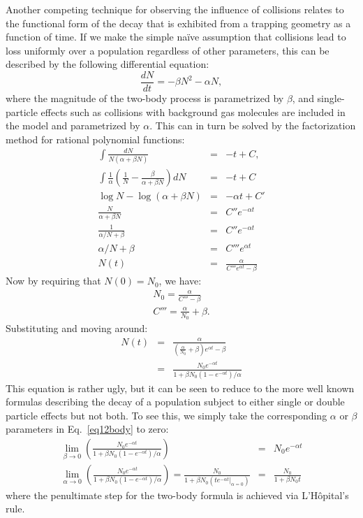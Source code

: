 Another competing technique for observing the influence of collisions relates to the functional form of the decay that is exhibited from a trapping geometry as a function of time.
If we make the simple na\"{i}ve assumption that collisions lead to loss uniformly over a population regardless of other parameters, this can be described by the following differential equation:
\begin{equation}
\frac{dN}{dt} = - \beta N^2  -\alpha N,
\end{equation}
where the magnitude of the two-body process is parametrized by $\beta$, and single-particle effects such as collisions with background gas molecules are included in the model and parametrized by $\alpha$.
This can in turn be solved by the factorization method for rational polynomial functions:
\begin{eqnarray}
\int\frac{dN}{N(\alpha+\beta N)} &=&- t + C,\\
\int\frac{1}{\alpha}\left(\frac{1}{N} - \frac{\beta}{\alpha +\beta N}  \right)dN &=& -t+C\\
\log{N} - \log{\left(\alpha + \beta N\right)} &=& -\alpha t + C'\\
\frac{N}{\alpha + \beta N} &=& C''e^{-\alpha t}\\
\frac{1}{\alpha/N + \beta} &=& C''e^{-\alpha t}\\
\alpha/N + \beta &=& C'''e^{\alpha t}\\
N(t) &=& \frac{\alpha}{C'''e^{\alpha t}-\beta}
\end{eqnarray}
Now by requiring that $N(0)=N_0$, we have:
\begin{eqnarray}
N_0 = \frac{\alpha}{C'''-\beta}\\
C''' = \frac{\alpha}{N_0}+\beta.
\end{eqnarray}
Substituting and moving around:
\begin{eqnarray}
N(t) &=& \frac{\alpha}{(\frac{\alpha}{N_0}+\beta)e^{\alpha t}-\beta}\\
&=& \frac{N_0 e^{-\alpha t}}{1 +\beta N_0(1-e^{-\alpha t})/\alpha}\label{eq12body}
\end{eqnarray}
This equation is rather ugly, but it can be seen to reduce to the more well known formulas describing the decay of a population subject to either single or double particle effects but not both.
To see this, we simply take the corresponding $\alpha$ or $\beta$ parameters in Eq.~\ref{eq12body} to zero:
\begin{eqnarray}
\lim_{\beta\rightarrow 0} \left(\frac{N_0 e^{-\alpha t}}{1 +\beta N_0(1-e^{-\alpha t})/\alpha}\right) &=& N_0 e^{-\alpha t}\\
\lim_{\alpha\rightarrow 0} \left(\frac{N_0 e^{-\alpha t}}{1 +\beta N_0(1-e^{-\alpha t})/\alpha}\right) = \frac{N_0}{1+\beta N_0 \left( te^{-\alpha t}|_{\alpha=0} \right)} &=& \frac{N_0}{1+\beta N_0 t}
\end{eqnarray}
where the penultimate step for the two-body formula is achieved via L'H\^{o}pital's rule.

